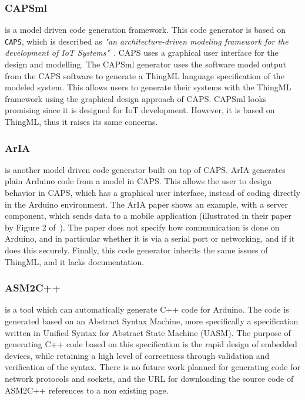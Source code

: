 \documentclass[manuscript,screen]{acmart}
\begin{document}
\subsubsection{CAPSml}
\cite{CASPml} is a model driven code generation framework. This code generator is based on \texttt{CAPS}, which is described as {\em "an architecture-driven modeling framework for the development of IoT Systems"}~\cite{muccini2017caps}. CAPS uses a graphical user interface for the design and modelling. The CAPSml generator uses the software model output from the CAPS software to generate a ThingML language specification of the modeled system. This allows users to generate their systems with the ThingML framework using the graphical design approach of CAPS. CAPSml looks promising since it is designed for IoT development. However, it is based on ThingML, thus it raises its same concerns. 


\subsubsection{ArIA}
\cite{ArIA} is another model driven code generator built on top of CAPS. ArIA generates plain Arduino code from a model in CAPS. This allows the user to design behavior in CAPS, which has a graphical user interface, instead of coding directly in the Arduino environment. The ArIA paper shows an example, with a server component, which sends data to a mobile application (illustrated in their paper by Figure 2 of~\cite{ArIA}). The paper does not specify how communication is done on Arduino, and in particular whether it is via a serial port or networking, and if it does this securely. Finally, this code generator inherits the same issues of ThingML, and it lacks documentation. 

\subsubsection{ASM2C++}
\cite{asm2c++} is a tool which can automatically generate C++ code for Arduino. The code is generated based on an Abstract Syntax Machine, more specifically a specification written in Unified Syntax for Abstract State Machine (UASM). The purpose of generating C++ code based on this specification is the rapid design of embedded devices, while retaining a high level of correctness through validation and verification of the syntax. There is no future work planned for generating code for network protocols and sockets, and the URL for downloading the source code of ASM2C++ references to a non existing page. 
\end{document}
